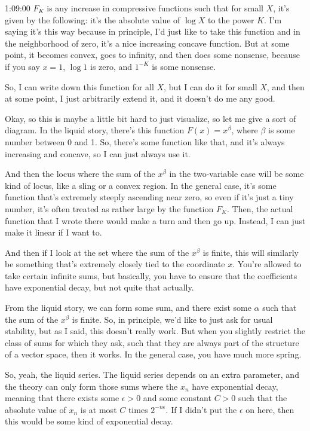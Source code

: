 \begin{unfinished}{1:09:00}
$F_K$ is any increase in compressive functions such that for small $X$, it's given by the following: it's the absolute value of $\log X$ to the power $K$. I'm saying it's this way because in principle, I'd just like to take this function and in the neighborhood of zero, it's a nice increasing concave function. But at some point, it becomes convex, goes to infinity, and then does some nonsense, because if you say $x = 1$, $\log 1$ is zero, and $1^{-K}$ is some nonsense. 

So, I can write down this function for all $X$, but I can do it for small $X$, and then at some point, I just arbitrarily extend it, and it doesn't do me any good.

Okay, so this is maybe a little bit hard to just visualize, so let me give a sort of diagram. In the liquid story, there's this function $F(x) = x^{\beta}$, where $\beta$ is some number between 0 and 1. So, there's some function like that, and it's always increasing and concave, so I can just always use it.

And then the locus where the sum of the $x^{\beta}$ in the two-variable case will be some kind of locus, like a sling or a convex region. In the general case, it's some function that's extremely steeply ascending near zero, so even if it's just a tiny number, it's often treated as rather large by the function $F_K$. Then, the actual function that I wrote there would make a turn and then go up. Instead, I can just make it linear if I want to.

And then if I look at the set where the sum of the $x^{\beta}$ is finite, this will similarly be something that's extremely closely tied to the coordinate $x$. You're allowed to take certain infinite sums, but basically, you have to ensure that the coefficients have exponential decay, but not quite that actually.

From the liquid story, we can form some sum, and there exist some $\alpha$ such that the sum of the $x^{\beta}$ is finite. So, in principle, we'd like to just ask for usual stability, but as I said, this doesn't really work. But when you slightly restrict the class of sums for which they ask, such that they are always part of the structure of a vector space, then it works. In the general case, you have much more spring.

So, yeah, the liquid series. The liquid series depends on an extra parameter, and the theory can only form those sums where the $x_n$ have exponential decay, meaning that there exists some $\epsilon > 0$ and some constant $C > 0$ such that the absolute value of $x_n$ is at most $C$ times $2^{-n\epsilon}$. If I didn't put the $\epsilon$ on here, then this would be some kind of exponential decay.


\end{unfinished}
